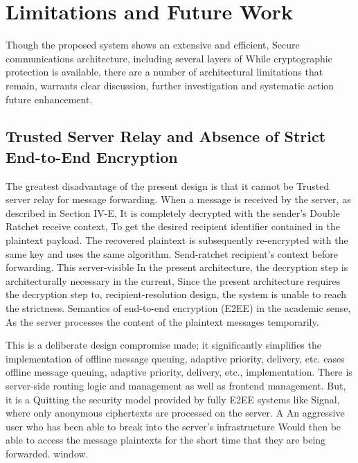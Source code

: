 \documentclass[conference]{IEEEtran}
\begin{document}
\section{Limitations and Future Work}

Though the proposed system shows an extensive and efficient,
Secure communications architecture, including several layers of
While cryptographic protection is available, there are a number of architectural limitations that remain,
warrants clear discussion, further investigation and systematic action
future enhancement.

\subsection{Trusted Server Relay and Absence of Strict End-to-End Encryption}

The greatest disadvantage of the present design is that it cannot be
Trusted server relay for message forwarding.
When a message is received by the server, as described in Section IV-E,
It is completely decrypted with the sender's Double Ratchet receive context,
To get the desired recipient identifier contained in the
plaintext payload.  The recovered plaintext is subsequently re-encrypted with the same key and uses the same algorithm.
Send-ratchet recipient's context before forwarding.  This server-visible
In the present architecture, the decryption step is architecturally necessary in the current, Since the present architecture requires the decryption step to,
recipient-resolution design, the system is unable to reach the strictness.
Semantics of end-to-end encryption (E2EE) in the academic sense,
As the server processes the content of the plaintext messages temporarily.

This is a deliberate design compromise made; it significantly
simplifies the implementation of offline message queuing, adaptive priority, delivery, etc. eases offline message queuing, adaptive priority, delivery, etc., implementation.
There is server-side routing logic and management as well as frontend management.  But, it is a
Quitting the security model provided by fully E2EE systems like
Signal, where only anonymous ciphertexts are processed on the server.  A
An aggressive user who has been able to break into the server's infrastructure
Would then be able to access the message plaintexts for the short time that they are being forwarded.
window.
\end{document}
